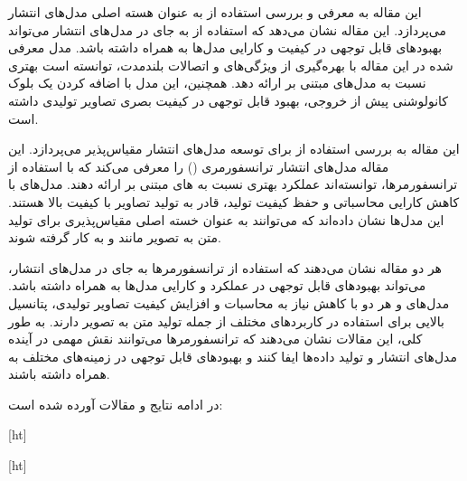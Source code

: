 





این مقاله به معرفی و بررسی استفاده از  به عنوان هسته اصلی مدل‌های انتشار می‌پردازد. این مقاله نشان می‌دهد که استفاده از  به جای  در مدل‌های انتشار می‌تواند بهبودهای قابل توجهی در کیفیت و کارایی مدل‌ها به همراه داشته باشد. مدل  معرفی شده در این مقاله با بهره‌گیری از ویژگی‌های  و اتصالات بلندمدت، توانسته است  بهتری نسبت به مدل‌های مبتنی بر  ارائه دهد. همچنین، این مدل با اضافه کردن یک بلوک کانولوشنی  پیش از خروجی، بهبود قابل توجهی در کیفیت بصری تصاویر تولیدی داشته است.

این مقاله به بررسی استفاده از  برای توسعه مدل‌های انتشار مقیاس‌پذیر می‌پردازد. این مقاله مدل‌های انتشار ترانسفورمری () را معرفی می‌کند که با استفاده از ترانسفورمرها، توانسته‌اند عملکرد بهتری نسبت به های مبتنی بر  ارائه دهند. مدل‌های  با کاهش کارایی محاسباتی و حفظ کیفیت تولید، قادر به تولید تصاویر با کیفیت بالا هستند. این مدل‌ها نشان داده‌اند که می‌توانند به عنوان خسته اصلی مقیاس‌پذیری برای تولید متن به تصویر مانند  و  به کار گرفته شوند.




هر دو مقاله نشان می‌دهند که استفاده از ترانسفورمرها به جای  در مدل‌های انتشار، می‌تواند بهبودهای قابل توجهی در عملکرد و کارایی مدل‌ها به همراه داشته باشد. مدل‌های  و  هر دو با کاهش نیاز به محاسبات و افزایش کیفیت تصاویر تولیدی، پتانسیل بالایی برای استفاده در کاربردهای مختلف از جمله تولید متن به تصویر دارند. به طور کلی، این مقالات نشان می‌دهند که ترانسفورمرها می‌توانند نقش مهمی در آینده مدل‌های انتشار و تولید داده‌ها ایفا کنند و بهبودهای قابل توجهی در زمینه‌های مختلف به همراه داشته باشند.



در ادامه نتایج و مقالات آورده شده است:


[ht]



[ht]
